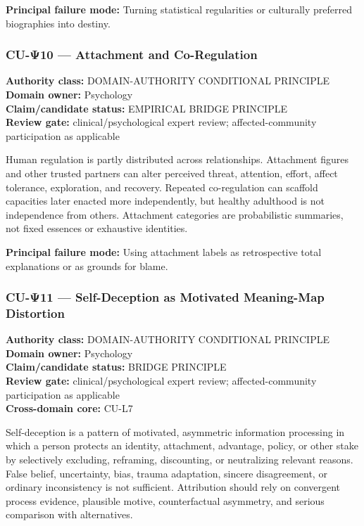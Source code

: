 \documentclass[
  11pt,
]{article}
\begin{document}
\textbf{Principal failure mode:} Turning statistical regularities or
culturally preferred biographies into destiny.

\subsubsection{CU-Ψ10 --- Attachment and
Co-Regulation}\label{cu-ux3c810-attachment-and-co-regulation}

\textbf{Authority class:} DOMAIN-AUTHORITY CONDITIONAL PRINCIPLE\\
\textbf{Domain owner:} Psychology\\
\textbf{Claim/candidate status:} EMPIRICAL BRIDGE PRINCIPLE\\
\textbf{Review gate:} clinical/psychological expert review;
affected-community participation as applicable

Human regulation is partly distributed across relationships. Attachment
figures and other trusted partners can alter perceived threat,
attention, effort, affect tolerance, exploration, and recovery. Repeated
co-regulation can scaffold capacities later enacted more independently,
but healthy adulthood is not independence from others. Attachment
categories are probabilistic summaries, not fixed essences or exhaustive
identities.

\textbf{Principal failure mode:} Using attachment labels as
retrospective total explanations or as grounds for blame.

\subsubsection{CU-Ψ11 --- Self-Deception as Motivated Meaning-Map
Distortion}\label{cu-ux3c811-self-deception-as-motivated-meaning-map-distortion}

\textbf{Authority class:} DOMAIN-AUTHORITY CONDITIONAL PRINCIPLE\\
\textbf{Domain owner:} Psychology\\
\textbf{Claim/candidate status:} BRIDGE PRINCIPLE\\
\textbf{Review gate:} clinical/psychological expert review;
affected-community participation as applicable\\
\textbf{Cross-domain core:} CU-L7

Self-deception is a pattern of motivated, asymmetric information
processing in which a person protects an identity, attachment,
advantage, policy, or other stake by selectively excluding, reframing,
discounting, or neutralizing relevant reasons. False belief,
uncertainty, bias, trauma adaptation, sincere disagreement, or ordinary
inconsistency is not sufficient. Attribution should rely on convergent
process evidence, plausible motive, counterfactual asymmetry, and
serious comparison with alternatives.
\end{document}
